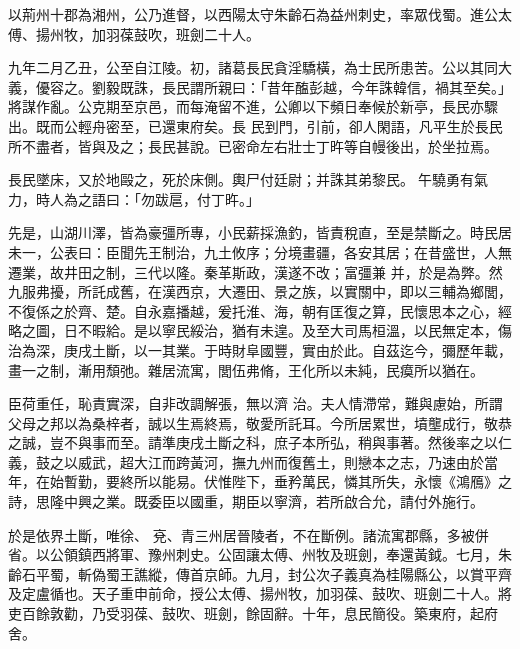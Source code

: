\begin{pinyinscope}
 以荊州十郡為湘州，公乃進督，以西陽太守朱齡石為益州刺史，率眾伐蜀。進公太傅、揚州牧，加羽葆鼓吹，班劍二十人。



 九年二月乙丑，公至自江陵。初，諸葛長民貪淫驕橫，為士民所患苦。公以其同大義，優容之。劉毅既誅，長民謂所親曰：「昔年醢彭越，今年誅韓信，禍其至矣。」將謀作亂。公克期至京邑，而每淹留不進，公卿以下頻日奉候於新亭，長民亦驟出。既而公輕舟密至，已還東府矣。長
 民到門，引前，卻人閑語，凡平生於長民所不盡者，皆與及之；長民甚說。已密命左右壯士丁旿等自幔後出，於坐拉焉。



 長民墜床，又於地毆之，死於床側。輿尸付廷尉；并誅其弟黎民。午驍勇有氣力，時人為之語曰：「勿跋扈，付丁旿。」



 先是，山湖川澤，皆為豪彊所專，小民薪採漁釣，皆責稅直，至是禁斷之。時民居未一，公表曰：臣聞先王制治，九土攸序；分境畫疆，各安其居；在昔盛世，人無遷業，故井田之制，三代以隆。秦革斯政，漢遂不改；富彊兼
 并，於是為弊。然九服弗擾，所託成舊，在漢西京，大遷田、景之族，以實關中，即以三輔為鄉閭，不復係之於齊、楚。自永嘉播越，爰托淮、海，朝有匡復之算，民懷思本之心，經略之圖，日不暇給。是以寧民綏治，猶有未遑。及至大司馬桓溫，以民無定本，傷治為深，庚戌土斷，以一其業。于時財阜國豐，實由於此。自茲迄今，彌歷年載，畫一之制，漸用頹弛。雜居流寓，閭伍弗脩，王化所以未純，民瘼所以猶在。



 臣荷重任，恥責實深，自非改調解張，無以濟
 治。夫人情滯常，難與慮始，所謂父母之邦以為桑梓者，誠以生焉終焉，敬愛所託耳。今所居累世，墳壟成行，敬恭之誠，豈不與事而至。請準庚戌土斷之科，庶子本所弘，稍與事著。然後率之以仁義，鼓之以威武，超大江而跨黃河，撫九州而復舊土，則戀本之志，乃速由於當年，在始暫勤，要終所以能易。伏惟陛下，垂矜萬民，憐其所失，永懷《鴻鴈》之詩，思隆中興之業。既委臣以國重，期臣以寧濟，若所啟合允，請付外施行。



 於是依界土斷，唯徐、
 兗、青三州居晉陵者，不在斷例。諸流寓郡縣，多被併省。以公領鎮西將軍、豫州刺史。公固讓太傅、州牧及班劍，奉還黃鉞。七月，朱齡石平蜀，斬偽蜀王譙縱，傳首京師。九月，封公次子義真為桂陽縣公，以賞平齊及定盧循也。天子重申前命，授公太傅、揚州牧，加羽葆、鼓吹、班劍二十人。將吏百餘敦勸，乃受羽葆、鼓吹、班劍，餘固辭。十年，息民簡役。築東府，起府舍。




\end{pinyinscope}
